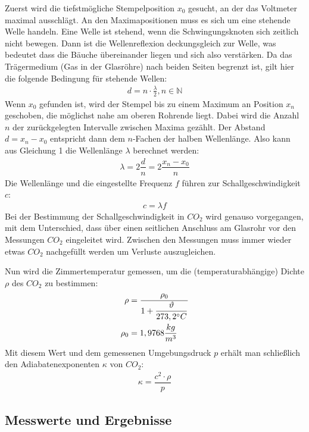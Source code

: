 \documentclass{scrartcl}
\begin{document}
Zuerst wird die tiefstmögliche Stempelposition $x_{0}$ gesucht, an der das Voltmeter maximal ausschlägt. An den Maximapositionen muss es sich um eine stehende Welle handeln. Eine Welle ist stehend, wenn die Schwingungsknoten sich zeitlich nicht bewegen.  Dann ist die Wellenreflexion deckungsgleich zur Welle, was bedeutet dass die Bäuche übereinander liegen und sich also verstärken. Da das Trägermedium (Gas in der Glasröhre) nach beiden Seiten begrenzt ist, gilt hier die folgende Bedingung für stehende Wellen:
\begin{align}
d = n  \cdot \frac{\lambda}{2}, n \in \mathbb{N}
\end{align}
Wenn $x_{0}$ gefunden ist, wird der Stempel bis zu einem Maximum an Position $x_{n}$ geschoben, die möglichst nahe am oberen Rohrende liegt. Dabei wird die Anzahl $n$ der zurückgelegten Intervalle zwischen Maxima gezählt. Der Abstand $d = x_{n} - x_{0}$ entspricht dann dem $n$-Fachen der halben Wellenlänge. Also kann aus Gleichung 1 die Wellenlänge $\lambda$ berechnet werden:
\begin{align}
\lambda = 2 \dfrac{d}{n} =  2 \dfrac{x_{n}-x_{0}}{n}
\end{align}
Die Wellenlänge und die eingestellte Frequenz $f$ führen zur Schallgeschwindigkeit $c$:
\begin{align}
c = \lambda f
\end{align}
Bei der Bestimmung der Schallgeschwindigkeit in $CO_{2}$ wird genauso vorgegangen, mit dem Unterschied, dass über einen seitlichen Anschluss am Glasrohr vor den Messungen $CO_{2}$ eingeleitet wird. Zwischen den Messungen muss immer wieder etwas $CO_{2}$ nachgefüllt werden um Verluste auszugleichen.

Nun wird die Zimmertemperatur gemessen, um die (temperaturabhängige) Dichte $\rho$ des $CO_{2}$ zu bestimmen:
\begin{align}
\rho & = \dfrac{\rho_{0}}{1 + \dfrac{\vartheta}{273,2 \degree C}} \\
\rho_{0} & = 1,9768 \dfrac{kg}{m^3}
\end{align}
Mit diesem Wert und dem gemessenen Umgebungsdruck $p$ erhält man schließlich den Adiabatenexponenten $\kappa$ von $CO_{2}$:
\begin{align}
\kappa = \dfrac{c^2 \cdot \rho}{p}
\end{align}
\newpage
\subsection{Messwerte und Ergebnisse}
\end{document}
